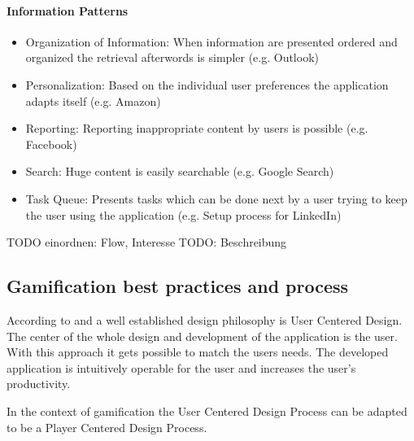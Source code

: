 \paragraph*{Information Patterns}
\begin{itemize}
	\item Organization of Information: When information are presented ordered and organized the retrieval afterwords is simpler (e.g. Outlook) \cite[p. 6, 85, 86]{lewisIrresistibleAppsMotivational2014}
	\item Personalization: Based on the individual user preferences the application adapts itself (e.g. Amazon) \cite[p. 6, 87]{lewisIrresistibleAppsMotivational2014}
	\item Reporting: Reporting inappropriate content by users is possible (e.g. Facebook) \cite[p. 6, 90]{lewisIrresistibleAppsMotivational2014}
	\item Search: Huge content is easily searchable (e.g. Google Search) \cite[p. 6, 90, 91]{lewisIrresistibleAppsMotivational2014}
	\item Task Queue: Presents tasks which can be done next by a user trying to keep the user using the application (e.g. Setup process for LinkedIn) \cite[p. 6, 93]{lewisIrresistibleAppsMotivational2014}
\end{itemize}

	
TODO einordnen: Flow, Interesse \newline
TODO: Beschreibung \cite[p. 19, 20, 21]{bierhoffeditorEnzyklopaediePsychologieSoziale2016}


\subsection{Gamification best practices and process}
\label{sec:theoryBd}

According to \cite[p. 5, 6]{lowdermilkUsercenteredDesignDevelopers2013} and \cite[p. 27, 28]{inproceedings} a well established design philosophy is User Centered Design. The center of the whole design and development of the application is the user. With this approach it gets possible to match the users needs. The developed application is intuitively operable for the user and increases the user's productivity.

In the context of gamification the User Centered Design Process can be adapted to be a Player Centered Design Process.  

